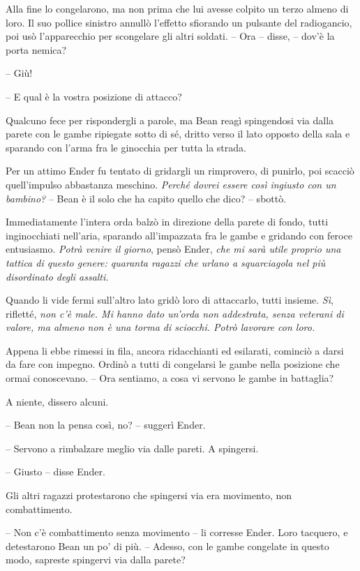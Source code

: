 {Alla fine lo congelarono, ma non prima che lui avesse colpito un terzo
	almeno di loro. Il suo pollice sinistro annullò l'effetto sfiorando un
	pulsante del radiogancio, poi usò l'apparecchio per scongelare gli altri
	soldati. -- Ora -- disse, -- dov'è la porta nemica?}

{-- Giù!}

{-- E qual è la vostra posizione di attacco?}

{Qualcuno fece per rispondergli a parole, ma Bean reagì spingendosi via
	dalla parete con le gambe ripiegate sotto di sé, dritto verso il lato
	opposto della sala e sparando con l'arma fra le ginocchia per tutta la
	strada.}

{Per un attimo Ender fu tentato di gridargli un rimprovero, di punirlo,
	poi scacciò quell'impulso abbastanza meschino. \emph{Perché dovrei
		essere così ingiusto con un bambino?} -- Bean è il solo che ha capito
	quello che dico? -- sbottò.}

{Immediatamente l'intera orda balzò in direzione della parete di fondo,
	tutti inginocchiati nell'aria, sparando all'impazzata fra le gambe e
	gridando con feroce entusiasmo. \emph{Potrà venire il giorno}, \emph{}
	pensò Ender, \emph{che mi sarà utile proprio una tattica di questo
		genere: quaranta ragazzi che urlano a squarciagola nel più disordinato
		degli assalti.}}

{Quando li vide fermi sull'altro lato gridò loro di attaccarlo, tutti
	insieme. \emph{Sì}, \emph{} rifletté, \emph{non c'è male. Mi hanno dato
		un'orda non addestrata, senza veterani di valore, ma almeno non è una
		torma di sciocchi. Potrò lavorare con loro.}}

{Appena li ebbe rimessi in fila, ancora ridacchianti ed esilarati,
	cominciò a darsi da fare con impegno. Ordinò a tutti di congelarsi le
	gambe nella posizione che ormai conoscevano. -- Ora sentiamo, a cosa vi
	servono le gambe in battaglia?}

{A niente, dissero alcuni.}

{-- Bean non la pensa così, no? -- suggerì Ender.}

{-- Servono a rimbalzare meglio via dalle pareti. A spingersi.}

{-- Giusto -- disse Ender.}

{Gli altri ragazzi protestarono che spingersi via era movimento, non
	combattimento.}

{-- Non c'è combattimento senza movimento -- li corresse Ender. Loro
	tacquero, e detestarono Bean un po' di più. -- Adesso, con le gambe
	congelate in questo modo, sapreste spingervi via dalla parete?}

